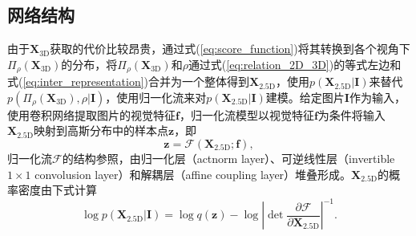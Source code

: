 \subsection{网络结构}
由于$\mathbf{X}_{\text{3D}}$获取的代价比较昂贵，通过式(\ref{eq:score_function})将其转换到各个视角下$\Pi_{\rho}(\mathbf{X}_{\text{3D}})$的分布，将$\Pi_\rho(\mathbf{X}_{\text{3D}})$和$\rho$通过式(\ref{eq:relation_2D_3D})的等式左边和式(\ref{eq:inter_representation})合并为一个整体得到$\mathbf{X}_{\text{2.5D}}$，使用$p(\mathbf{X}_{\text{2.5D}}|\mathbf{I})$来替代$p(\Pi_\rho(\mathbf{X}_{\text{3D}}), \rho|\mathbf{I})$，使用归一化流来对$p(\mathbf{X}_{\text{2.5D}}|\mathbf{I})$建模。给定图片$\mathbf{I}$作为输入，使用卷积网络提取图片的视觉特征$\mathbf{f}$，归一化流模型以视觉特征$\mathbf{f}$为条件将输入$\mathbf{X}_{\text{2.5D}}$映射到高斯分布中的样本点$\mathbf{z}$，即
\begin{equation}
	\mathbf{z} = \mathcal{F}(\mathbf{X}_{\text{2.5D}};\mathbf{f}),
\end{equation}
归一化流$\mathcal{F}$的结构参照\citet{Glow}，由归一化层（actnorm layer）、可逆线性层（invertible $1\times1$ convolusion layer）和解耦层（affine coupling layer）堆叠形成。$\mathbf{X}_{\text{2.5D}}$的概率密度由下式计算
\begin{equation}
	\log p(\mathbf{X}_{\text{2.5D}}|\mathbf{I}) = \log q(\mathbf{z}) - \log \left| \det \frac{\partial \mathcal{F}}{\partial \mathbf{X}_{\text{2.5D}}} \right|^{-1}.
\end{equation}

